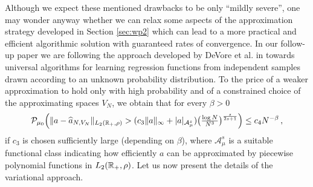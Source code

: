 Although we expect these mentioned drawbacks to be only ``mildly severe'', one may wonder anyway whether we can relax some aspects of the approximation strategy developed
in Section \ref{sec:wp2} which can lead to a more practical and efficient algorithmic solution with guaranteed rates of convergence.
In our follow-up paper \cite{bofohamaXX} we are following the approach developed by DeVore et al. in \cite{MR2249856,MR2327596} towards universal algorithms for learning regression functions from independent samples drawn according to an unknown probability distribution. To the  price of a  weaker approximation to hold only with high probability and of a constrained choice of the approximating spaces $V_N$, we obtain that for every $\beta>0$
	\begin{equation}\label{finalestimate}
		\mathcal P_{\mu_0} \Bigl(\|a- \widehat a_{N,V_N}\|_{L_2(\mathbb{R}_+,\rho)}
			>(c_3\|a\|_\infty+|a|_{\mathcal{A}^s_\mu})\bigl(\tfrac{\log N}{N^3}\bigr)^{\frac{s}{2s+1}}\Bigr)
			\leq c_4 N^{-\beta}\,,
	\end{equation}
	if $c_3$ is chosen sufficiently large (depending on $\beta$), where $\mathcal{A}^s_\mu$ is a suitable functional class indicating how efficiently $a$ can be approximated by piecewise polynomial functions in  $L_2(\mathbb{R}_+,\rho)$. Let us now present the details of the variational approach.